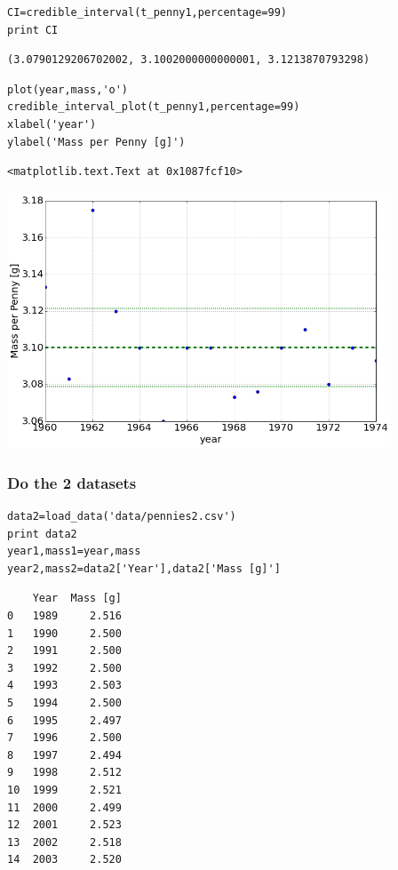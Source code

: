 \begin{lstlisting}
CI=credible_interval(t_penny1,percentage=99)
print CI
\end{lstlisting}

\begin{verbatim}
(3.0790129206702002, 3.1002000000000001, 3.1213870793298)
\end{verbatim}

\begin{lstlisting}
plot(year,mass,'o')
credible_interval_plot(t_penny1,percentage=99)
xlabel('year')
ylabel('Mass per Penny [g]')
\end{lstlisting}

\begin{verbatim}
<matplotlib.text.Text at 0x1087fcf10>
\end{verbatim}

\begin{center}\includegraphics[width=4.5in]{Applications_of_Parameter_Estimation/Applications_of_Parameter_Estimation_fig6.png}\end{center}

\subsubsection{Do the 2 datasets}


\begin{lstlisting}
data2=load_data('data/pennies2.csv')
print data2
year1,mass1=year,mass
year2,mass2=data2['Year'],data2['Mass [g]']
\end{lstlisting}

\begin{verbatim}
    Year  Mass [g]
0   1989     2.516
1   1990     2.500
2   1991     2.500
3   1992     2.500
4   1993     2.503
5   1994     2.500
6   1995     2.497
7   1996     2.500
8   1997     2.494
9   1998     2.512
10  1999     2.521
11  2000     2.499
12  2001     2.523
13  2002     2.518
14  2003     2.520
\end{verbatim}

